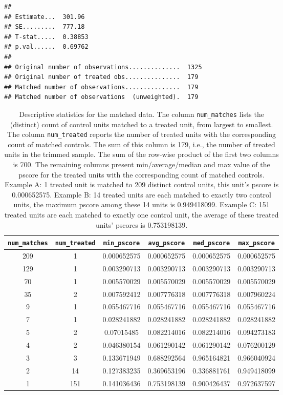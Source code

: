 \documentclass[
]{article}
\begin{document}
\begin{enumerate}
\begin{verbatim}
## 
## Estimate...  301.96 
## SE.........  777.18 
## T-stat.....  0.38853 
## p.val......  0.69762 
## 
## Original number of observations..............  1325 
## Original number of treated obs...............  179 
## Matched number of observations...............  179 
## Matched number of observations  (unweighted).  179
\end{verbatim}
\end{enumerate}

\newpage 
\begin{table}[h]
\centering
\begin{tabular}{|c|c|c|c|c|c|}
\hline
\textbf{\texttt{num\_matches}} & \textbf{\texttt{num\_treated}} & \textbf{\texttt{min\_pscore}} & \textbf{\texttt{avg\_pscore}} & \textbf{\texttt{med\_pscore}} & \textbf{\texttt{max\_pscore}} \\ \hline
209 & 1 & 0.000652575 & 0.000652575 & 0.000652575 & 0.000652575 \\ \hline
129 & 1 & 0.003290713 & 0.003290713 & 0.003290713 & 0.003290713 \\ \hline
70 & 1 & 0.005570029 & 0.005570029 & 0.005570029 & 0.005570029 \\ \hline
35 & 2 & 0.007592412 & 0.007776318 & 0.007776318 & 0.007960224 \\ \hline
9 & 1 & 0.055467716 & 0.055467716 & 0.055467716 & 0.055467716 \\ \hline
7 & 1 & 0.028241882 & 0.028241882 & 0.028241882 & 0.028241882 \\ \hline
5 & 2 & 0.07015485 & 0.082214016 & 0.082214016 & 0.094273183 \\ \hline
4 & 2 & 0.046380154 & 0.061290142 & 0.061290142 & 0.076200129 \\ \hline
3 & 3 & 0.133671949 & 0.688292564 & 0.965164821 & 0.966040924 \\ \hline
2 & 14 & 0.127383235 & 0.369653196 & 0.336881761 & 0.949418099 \\ \hline
1 & 151 & 0.141036436 & 0.753198139 & 0.900426437 & 0.972637597 \\ \hline
\end{tabular}

\caption{Descriptive statistics for the matched data. The column \texttt{num\_matches} lists the (distinct) count of control units matched to a treated unit, from largest to smallest. The column \texttt{num\_treated} reports the number of treated units with the corresponding count of matched controls. The sum of this column is 179, i.e., the number of treated units in the trimmed sample. The sum of the row-wise product of the first two columns is 700. The remaining columns present min/average/median and max value of the pscore for the treated units with the corresponding count of matched controls. Example A: 1 treated unit is matched to 209 distinct control units, this unit's pscore is 0.000652575. Example B: 14 treated units are each matched to exactly two control units, the maximum pscore among these 14 units is 0.949418099. Example C: 151 treated units are each matched to exactly one control unit, the average of these treated units' pscores is 0.753198139.}
\label{tab:matched-set-ds}
\end{table}
\end{document}
